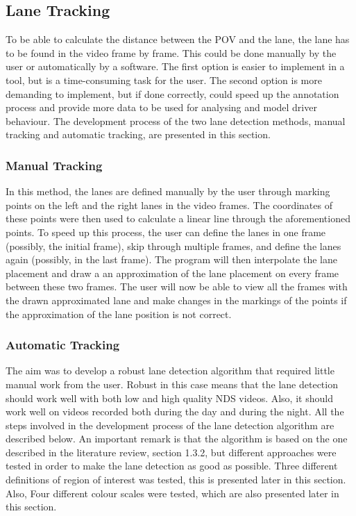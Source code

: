 \subsection{Lane Tracking}

To be able to calculate the distance between the POV and the lane, the lane has to be found in the video frame by frame. This could be done manually by the user or automatically by a software. The first option is easier to implement in a tool, but is a time-consuming task for the user. The second option is more demanding to implement, but if done correctly, could speed up the annotation process and provide more data to be used for analysing and model driver behaviour. The development process of the two lane detection methods, manual tracking and automatic tracking, are presented in this section.  

\subsubsection{Manual Tracking}

In this method, the lanes are defined manually by the user through marking points on the left and the right lanes in the video frames. The coordinates of these points were then used to calculate a linear line through the aforementioned points. To speed up this process, the user can define the lanes in one frame (possibly, the initial frame), skip through multiple frames, and define the lanes again (possibly, in the last frame). The program will then interpolate the lane placement and draw a an approximation of the lane placement on every frame between these two frames. The user will now be able to view all the frames with the drawn approximated lane and make changes in the markings of the points if the approximation of the lane position is not correct. 


\subsubsection{Automatic Tracking}
The aim was to develop a robust lane detection algorithm that required little manual work from the user. Robust in this case means that the lane detection should work well with both low and high quality NDS videos. Also, it should work well on videos recorded both during the day and during the night. All the steps involved in the development process of the lane detection algorithm are described below. An important remark is that  the algorithm is based on the one described in the literature review, section 1.3.2, but different approaches were tested in order to make the lane detection as good as possible. Three different definitions of region of interest was tested, this is presented later in this section. Also, Four different colour scales were tested, which are also presented later in this section. 


